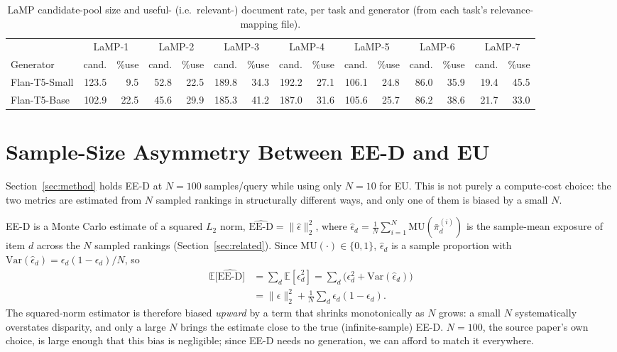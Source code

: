 \documentclass[10pt,twocolumn]{article}
\begin{document}
\begin{table}[t]
\centering
\scriptsize
\caption{LaMP candidate-pool size and useful- (i.e.\ relevant-) document rate, per task and generator (from each task's relevance-mapping file).}
\label{tab:corpus}
\begin{tabular}{@{}lrrrrrrrrrrrrrr@{}}
\toprule
& \multicolumn{2}{c}{LaMP-1} & \multicolumn{2}{c}{LaMP-2} & \multicolumn{2}{c}{LaMP-3} & \multicolumn{2}{c}{LaMP-4} & \multicolumn{2}{c}{LaMP-5} & \multicolumn{2}{c}{LaMP-6} & \multicolumn{2}{c}{LaMP-7} \\
Generator & cand. & \%use & cand. & \%use & cand. & \%use & cand. & \%use & cand. & \%use & cand. & \%use & cand. & \%use \\
\midrule
Flan-T5-Small & 123.5 & 9.5 & 52.8 & 22.5 & 189.8 & 34.3 & 192.2 & 27.1 & 106.1 & 24.8 & 86.0 & 35.9 & 19.4 & 45.5 \\
Flan-T5-Base  & 102.9 & 22.5 & 45.6 & 29.9 & 185.3 & 41.2 & 187.0 & 31.6 & 105.6 & 25.7 & 86.2 & 38.6 & 21.7 & 33.0 \\
\bottomrule
\end{tabular}
\end{table}

\section{Sample-Size Asymmetry Between EE-D and EU}
\label{app:eed-bias}

Section~\ref{sec:method} holds EE-D at $N{=}100$ samples/query while using only
$N{=}10$ for EU. This is not purely a compute-cost choice: the two metrics are
estimated from $N$ sampled rankings in structurally different ways, and only one
of them is biased by a small $N$.

EE-D is a Monte Carlo estimate of a squared $L_2$ norm,
$\widehat{\text{EE-D}} = \lVert \hat\epsilon \rVert_2^2$, where
$\hat\epsilon_d = \frac{1}{N}\sum_{i=1}^N \mathrm{MU}(\bar\pi^{(i)}_d)$ is the
sample-mean exposure of item $d$ across the $N$ sampled rankings
(Section~\ref{sec:related}). Since $\mathrm{MU}(\cdot) \in \{0,1\}$,
$\hat\epsilon_d$ is a sample proportion with
$\mathrm{Var}(\hat\epsilon_d) = \epsilon_d(1{-}\epsilon_d)/N$, so
\begin{align*}
\mathbb{E}\big[\widehat{\text{EE-D}}\big] &= \sum_d \mathbb{E}[\hat\epsilon_d^2]
= \sum_d \big(\epsilon_d^2 + \mathrm{Var}(\hat\epsilon_d)\big) \\
&= \lVert \epsilon \rVert_2^2 + \frac{1}{N}\sum_d \epsilon_d(1{-}\epsilon_d).
\end{align*}
The squared-norm estimator is therefore biased \emph{upward} by a term that
shrinks monotonically as $N$ grows: a small $N$ systematically overstates
disparity, and only a large $N$ brings the estimate close to the true
(infinite-sample) EE-D. $N{=}100$, the source paper's own choice, is large
enough that this bias is negligible; since EE-D needs no generation, we can
afford to match it everywhere.
\end{document}
